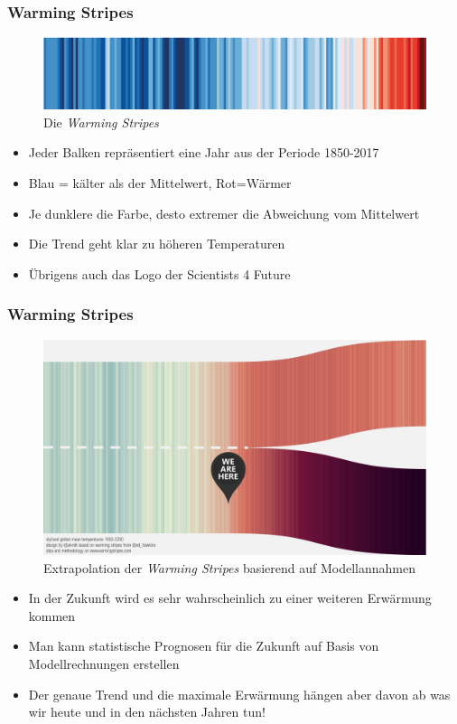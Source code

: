 

\begin{frame}
	\frametitle{Warming Stripes}
	
	\begin{figure}
		\centering
		\includegraphics[width=\linewidth]{bilder/s4f-warming-stripes}
		\caption{Die \textit{Warming Stripes}}
		\label{fig:s4f-warming-stripes}
	\end{figure}
	\begin{itemize}
		\item Jeder Balken repräsentiert eine Jahr aus der Periode 1850-2017
		\item Blau = kälter als der Mittelwert, Rot=Wärmer
		\item Je dunklere die Farbe, desto extremer die Abweichung vom Mittelwert
		\item Die Trend geht klar zu höheren Temperaturen
		\item Übrigens auch das Logo der Scientists 4 Future
	\end{itemize}
\end{frame}

\begin{frame}
	\frametitle{Warming Stripes}
	\begin{figure}
		\centering
		\includegraphics[width=0.6\linewidth]{bilder/warming_stripes_zukunft}
		\caption{Extrapolation der \textit{Warming Stripes} basierend auf Modellannahmen}
	\end{figure}
	\begin{itemize}
		\item In der Zukunft wird es sehr wahrscheinlich zu einer weiteren Erwärmung kommen
		\item Man kann statistische Prognosen für die Zukunft auf Basis von Modellrechnungen erstellen
		\item Der genaue Trend und die maximale Erwärmung hängen aber davon ab was wir heute und in den nächsten Jahren tun!
	\end{itemize}

\end{frame}